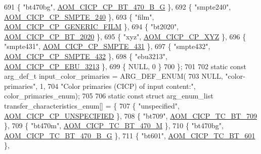 \begin{DoxyCodeInclude}
{{{{{{{691   \{ \textcolor{stringliteral}{"bt470bg"}, \hyperlink{aom__image_8h_a5267ad095a088ece3499336812503cefa8b33dc8483c16048c606d75d9f11e38a}{AOM\_CICP\_CP\_BT\_470\_B\_G} \},
692   \{ \textcolor{stringliteral}{"smpte240"}, \hyperlink{aom__image_8h_a5267ad095a088ece3499336812503cefa1a8b2e5694489121f80a406d9da25dfb}{AOM\_CICP\_CP\_SMPTE\_240} \},
693   \{ \textcolor{stringliteral}{"film"}, \hyperlink{aom__image_8h_a5267ad095a088ece3499336812503cefa8dd6ba5106c22d149a233e73232aeb65}{AOM\_CICP\_CP\_GENERIC\_FILM} \},
694   \{ \textcolor{stringliteral}{"bt2020"}, \hyperlink{aom__image_8h_a5267ad095a088ece3499336812503cefa6bb95baf09cd6e1f3596b459712c592a}{AOM\_CICP\_CP\_BT\_2020} \},
695   \{ \textcolor{stringliteral}{"xyz"}, \hyperlink{aom__image_8h_a5267ad095a088ece3499336812503cefa6032cae72a729933a6a75e3b943a542c}{AOM\_CICP\_CP\_XYZ} \},
696   \{ \textcolor{stringliteral}{"smpte431"}, \hyperlink{aom__image_8h_a5267ad095a088ece3499336812503cefa54d519c9ac0ca52ebda7caf736530e57}{AOM\_CICP\_CP\_SMPTE\_431} \},
697   \{ \textcolor{stringliteral}{"smpte432"}, \hyperlink{aom__image_8h_a5267ad095a088ece3499336812503cefa227b6e4116ed0266af20b705aebaf661}{AOM\_CICP\_CP\_SMPTE\_432} \},
698   \{ \textcolor{stringliteral}{"ebu3213"}, \hyperlink{aom__image_8h_a5267ad095a088ece3499336812503cefa9e74dcb338953bfab3101aa33ea44157}{AOM\_CICP\_CP\_EBU\_3213} \},
699   \{ NULL, 0 \}
700 \};
701 
702 \textcolor{keyword}{static} \textcolor{keyword}{const} arg\_def\_t input\_color\_primaries = ARG\_DEF\_ENUM(
703     NULL, \textcolor{stringliteral}{"color-primaries"}, 1,
704     \textcolor{stringliteral}{"Color primaries (CICP) of input content:"}, color\_primaries\_enum);
705 
706 \textcolor{keyword}{static} \textcolor{keyword}{const} \textcolor{keyword}{struct }arg\_enum\_list transfer\_characteristics\_enum[] = \{
707   \{ \textcolor{stringliteral}{"unspecified"}, \hyperlink{aom__image_8h_a5267ad095a088ece3499336812503cefa0835a3af8e6ffc6df298b6e64f878431}{AOM\_CICP\_CP\_UNSPECIFIED} \},
708   \{ \textcolor{stringliteral}{"bt709"}, \hyperlink{aom__image_8h_a30655997e3fb79889ee23eb294cb1992affe340e422646b7d70ef91edd6a8053c}{AOM\_CICP\_TC\_BT\_709} \},
709   \{ \textcolor{stringliteral}{"bt470m"}, \hyperlink{aom__image_8h_a30655997e3fb79889ee23eb294cb1992a356d6943d11d88e7a42370c1c698c214}{AOM\_CICP\_TC\_BT\_470\_M} \},
710   \{ \textcolor{stringliteral}{"bt470bg"}, \hyperlink{aom__image_8h_a30655997e3fb79889ee23eb294cb1992a7a347c6d5605db0a6ee89cc81dec0b37}{AOM\_CICP\_TC\_BT\_470\_B\_G} \},
711   \{ \textcolor{stringliteral}{"bt601"}, \hyperlink{aom__image_8h_a30655997e3fb79889ee23eb294cb1992a5b51bfcf0f3779a7d907ac45ee4067a4}{AOM\_CICP\_TC\_BT\_601} \},
}}}}}}}
\end{DoxyCodeInclude}

